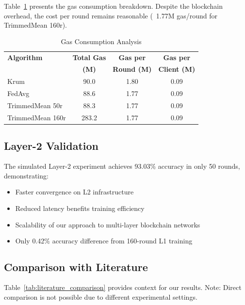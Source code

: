 \documentclass{ieeeaccess}
\begin{document}
Table~\ref{tab:gas_analysis} presents the gas consumption breakdown. Despite the blockchain overhead, the cost per round remains reasonable (~1.77M gas/round for TrimmedMean 160r).

\begin{table}[t]
\caption{Gas Consumption Analysis}
\label{tab:gas_analysis}
\centering
\begin{tabular}{lccc}
\toprule
\textbf{Algorithm} & \textbf{Total Gas} & \textbf{Gas per} & \textbf{Gas per} \\
& \textbf{(M)} & \textbf{Round (M)} & \textbf{Client (M)} \\
\midrule
Krum & 90.0 & 1.80 & 0.09 \\
FedAvg & 88.6 & 1.77 & 0.09 \\
TrimmedMean 50r & 88.3 & 1.77 & 0.09 \\
TrimmedMean 160r & 283.2 & 1.77 & 0.09 \\
\bottomrule
\end{tabular}
\end{table}

\subsection{Layer-2 Validation}

The simulated Layer-2 experiment achieves 93.03\% accuracy in only 50 rounds, demonstrating:
\begin{itemize}
    \item Faster convergence on L2 infrastructure
    \item Reduced latency benefits training efficiency
    \item Scalability of our approach to multi-layer blockchain networks
    \item Only 0.42\% accuracy difference from 160-round L1 training
\end{itemize}

\subsection{Comparison with Literature}

Table~\ref{tab:literature_comparison} provides context for our results. Note: Direct comparison is not possible due to different experimental settings.
\end{document}
